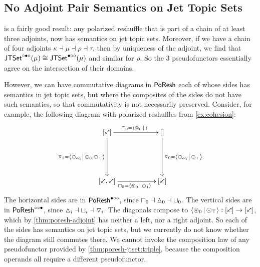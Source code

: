 \documentclass[a4paper]{memoir}
\begin{document}
\subsection{No Adjoint Pair Semantics on Jet Topic Sets} \label{sec:poresh-jtset:nogo}
 is a fairly good result: any polarized reshuffle that is part of a chain of at least three adjoints, now has semantics on jet topic sets.
Moreover, if we have a chain of four adjoints $\kappa \dashv \mu \dashv \rho \dashv \tau$, then by uniqueness of the adjoint, we find that $\mathsf{JTSet}^{\circ \bullet \circ}(\mu) \cong \mathsf{JTSet}^{\bullet \circ \circ}(\mu)$ and similar for $\rho$.
So the 3 pseudofunctors essentially agree on the intersection of their domains.

However, we can have commutative diagrams in $\mathsf{PoResh}$ each of whose sides has semantics in jet topic sets, but where the composites of the sides do not have such semantics, so that commutativity is not necessarily preserved.
Consider, for example, the following diagram with polarized reshuffles from \cref{ex:cohesion}:
\[
	\xymatrix{
		[\ypolar]
			\ar[rr]^{\cohpi_0 = \reshlist{\isopol_0}{}}
			\ar[dd]_{\cohcodisc_1 = \reshlist{\nonpol_\eqtydeg}{\pospol_0, \nonpol_\top}}
		&&
		[]
			\ar[dd]^{\cohcodisc_0 = \reshlist{\nonpol_\eqtydeg}{\nonpol_\top}}
		\\ \\
		[\ypolar, \ypolar]
			\ar[rr]_{\cohpi_0 = \reshlist{\isopol_0}{\pospol_1}}
		&&
		[\ypolar]
	}
\]
The horizontal sides are in $\mathsf{PoResh}^{\bullet \circ \circ}$, since ${\sqcap}_0 \dashv {\vartriangle}_0 \dashv {\sqcup}_0$.
The vertical sides are in $\mathsf{PoResh}^{\circ \circ \bullet}$, since ${\vartriangle}_i \dashv {\sqcup}_i \dashv {\triangledown}_i$.
The diagonals compose to $\reshlist{\isopol_0}{\nonpol_\top} : [\ypolar] \to [\ypolar]$, which by \cref{thm:poresh-adjoint} has neither a left, nor a right adjoint.
So each of the sides has semantics on jet topic sets, but we currently do not know whether the diagram still commutes there.
We cannot invoke the composition law of any pseudofunctor provided by \cref{thm:poresh-jtset:triple}, because the composition operands all require a different pseudofunctor.
\end{document}
